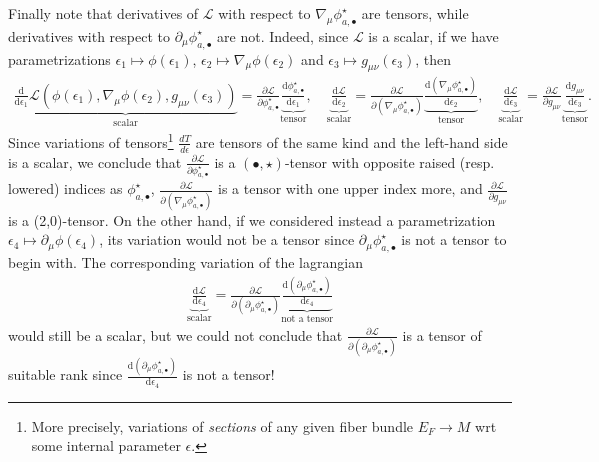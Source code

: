 \begin{mytheorem}
Finally note that derivatives of $\mathcal{L}$ with respect to $\nabla_\mu \phi^\star_{a,\bullet}$ are tensors, while derivatives with respect to $\partial_\mu \phi^\star_{a,\bullet}$ are not.
Indeed, since $\mathcal{L}$ is a scalar, if we have parametrizations $\epsilon_1 \mapsto \phi(\epsilon_1)$, $\epsilon_2 \mapsto \nabla_\mu \phi(\epsilon_2)$ and $\epsilon_3\mapsto g_{\mu\nu}(\epsilon_3)$, then
{\small   
\begin{align}
    \underbrace{\frac{\mathrm{d}}{\mathrm{d}\epsilon_1} \mathcal{L}(\phi(\epsilon_1), \nabla_\mu \phi(\epsilon_2), g_{\mu\nu}(\epsilon_3))}_{\mathrm{scalar}}
    = \frac{\partial \mathcal{L}}{\partial \phi^\star_{a,\bullet}} \underbrace{\frac{\mathrm{d}\phi^\star_{a,\bullet}}{\mathrm{d}\epsilon_1}}_{\mathrm{tensor}},
    \quad
    \underbrace{\frac{\mathrm{d}\mathcal{L}}{\mathrm{d}\epsilon_2}}_{\mathrm{scalar}}=\frac{\partial \mathcal{L}}{\partial (\nabla_\mu \phi^\star_{a,\bullet})} \underbrace{\frac{\mathrm{d}(\nabla_\mu \phi^\star_{a,\bullet})}{\mathrm{d}\epsilon_2}}_{\mathrm{tensor}},
    \quad 
    \underbrace{\frac{\mathrm{d}\mathcal{L}}{\mathrm{d}\epsilon_3}}_{\mathrm{scalar}} =\frac{\partial \mathcal{L}}{\partial g_{\mu\nu}} \underbrace{\frac{\mathrm{d}g_{\mu\nu}}{\mathrm{d}\epsilon_3}}_{\mathrm{tensor}}.
\end{align}
}
Since variations of tensors\footnote{More precisely, variations of \emph{sections} of any given fiber bundle $E_F\to M$ wrt some internal parameter $\epsilon$.} $\frac{d T}{d\epsilon}$ are tensors of the same kind and the left-hand side is a scalar, we conclude that $\frac{\partial \mathcal{L}}{\partial \phi^\star_{a,\bullet}}$ is a $(\bullet,\star)$-tensor with opposite raised (resp. lowered) indices as $\phi^\star_{a,\bullet}$, $\frac{\partial \mathcal{L}}{\partial (\nabla_\mu \phi^\star_{a,\bullet})}$ is a tensor with one upper index more, and $\frac{\partial \mathcal{L}}{\partial g_{\mu\nu}}$ is a (2,0)-tensor.
On the other hand, if we considered instead  a parametrization $\epsilon_4 \mapsto \partial_\mu \phi(\epsilon_4)$, its variation would not be a tensor since $\partial_\mu \phi^\star_{a,\bullet}$ is not a tensor to begin with.
The corresponding variation of the lagrangian
{\small
\begin{align}
    \underbrace{\frac{\mathrm{d}\mathcal{L}}{\mathrm{d}\epsilon_4}}_{\mathrm{scalar}}=
    \frac{\partial \mathcal{L}}{\partial (\partial_\mu \phi^\star_{a,\bullet})} \underbrace{\frac{\mathrm{d}(\partial_\mu \phi^\star_{a,\bullet})}{\mathrm{d}\epsilon_4}}_{\text{not a tensor}}
\end{align}
}
would still be a scalar, but we could not conclude that $\frac{\partial \mathcal{L}}{\partial (\partial_\mu \phi^\star_{a,\bullet})}$ is a tensor of suitable rank since $\frac{\mathrm{d}(\partial_\mu \phi^\star_{a,\bullet})}{\mathrm{d}\epsilon_4}$ is not a tensor!


\end{mytheorem}
